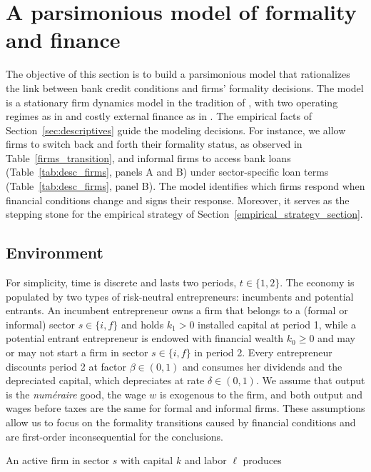 \documentclass[12pt]{article}
\begin{document}
\section{A parsimonious model of formality and finance}
\label{sec:toy}

The objective of this section is to build a parsimonious model that rationalizes the link between bank credit conditions and firms' formality decisions. The model is a stationary firm dynamics model in the tradition of \citet{hopenhayn1992entry}, with two operating regimes as in \citet{ulyssea2018firms} and costly external finance as in \citet{gomes2001financing}. The empirical facts of Section~\ref{sec:descriptives} guide the modeling decisions. For instance, we allow firms to switch back and forth their formality status, as observed in Table~\ref{firms_transition}, and informal firms to access bank loans (Table~\ref{tab:desc_firms}, panels A and B) under sector-specific loan terms (Table~\ref{tab:desc_firms}, panel B). The model identifies which firms respond when financial conditions change and signs their response. Moreover, it serves as the stepping stone for the empirical strategy of Section~\ref{empirical_strategy_section}.

\subsection{Environment}
\label{sec:toy-env}

For simplicity, time is discrete and lasts two periods, $t\in\{1,2\}$. The economy is populated by two types of risk-neutral entrepreneurs: incumbents and potential entrants. An incumbent entrepreneur owns a firm that belongs to a (formal or informal) sector $s\in\{i,f\}$ and holds $k_{1}>0$ installed capital at period 1, while a potential entrant entrepreneur is endowed with financial wealth $k_{0}\geq 0$ and may or may not start a firm in sector $s\in\{i,f\}$ in period 2. Every entrepreneur discounts period 2 at factor $\beta\in(0,1)$ and consumes her dividends and the depreciated capital, which depreciates at rate $\delta\in(0,1)$. We assume that output is the \textit{numéraire} good, the wage $w$ is exogenous to the firm, and both output and wages before taxes are the same for formal and informal firms. These assumptions allow us to focus on the formality transitions caused by financial conditions and are first-order inconsequential for the conclusions.

An active firm in sector $s$ with capital $k$ and labor $\ell$ produces
\end{document}
